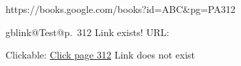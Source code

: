 \documentclass{article}
\begin{document}
\expandafter\gdef\csname gblink@Test@p.~312\endcsname{https://books.google.com/books?id=ABC&pg=PA312}

\ifcsname gblink@Test@p.~312\endcsname
  Link exists! URL: \csname gblink@Test@p.~312\endcsname
  
  Clickable: \href{\csname gblink@Test@p.~312\endcsname}{Click page 312}
\else
  Link does not exist
\fi
\end{document}
